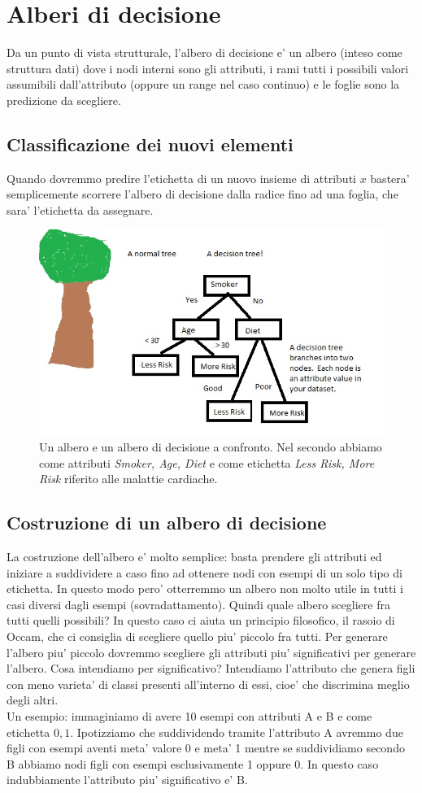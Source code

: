 \section{Alberi di decisione}
Da un punto di vista strutturale, l'albero di decisione e' un albero (inteso come struttura dati) dove i nodi interni sono gli attributi, i rami tutti i possibili valori assumibili dall'attributo (oppure un range nel caso continuo) e le foglie sono la predizione da scegliere.

\subsection{Classificazione dei nuovi elementi}
Quando dovremmo predire l'etichetta di un nuovo insieme di attributi $x$ bastera' semplicemente scorrere l'albero di decisione dalla radice fino ad una foglia, che sara' l'etichetta da assegnare.

\begin{figure}[H]
	\centering
	\includegraphics[width=0.7\linewidth]{img/dectree}
	\caption{Un albero e un albero di decisione a confronto. Nel secondo abbiamo come attributi \textit{Smoker, Age, Diet} e come etichetta \textit{Less Risk, More Risk} riferito alle malattie cardiache. }
	\label{fig:dectree}
\end{figure}


\subsection{Costruzione di un albero di decisione}
La costruzione dell'albero e' molto semplice: basta prendere gli attributi ed iniziare a suddividere a caso fino ad ottenere nodi con esempi di un solo tipo di etichetta.
In questo modo pero' otterremmo un albero  non molto utile in tutti i casi diversi dagli esempi (sovradattamento). Quindi quale albero scegliere fra tutti quelli possibili? In questo caso ci aiuta un principio filosofico, il rasoio di Occam, che ci consiglia di scegliere quello piu' piccolo fra tutti. Per generare l'albero piu' piccolo dovremmo scegliere gli attributi piu' significativi per generare l'albero. Cosa intendiamo per significativo? Intendiamo l'attributo che genera figli con meno varieta' di classi presenti all'interno di essi, cioe' che discrimina meglio degli altri.\\ Un esempio: immaginiamo di avere 10 esempi con attributi A e B e come etichetta ${0,1}$. Ipotizziamo che suddividendo tramite l'attributo A avremmo due figli con esempi aventi meta' valore 0 e meta' 1 mentre se suddividiamo secondo B abbiamo nodi figli con esempi esclusivamente 1 oppure 0. In questo caso indubbiamente l'attributo piu' significativo e' B.



